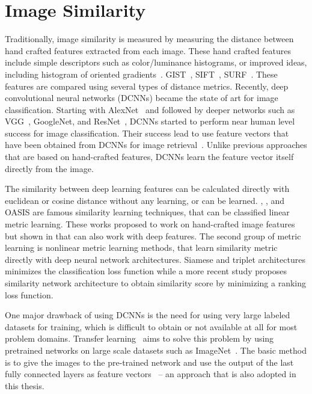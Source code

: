 \section{Image Similarity}

Traditionally, image similarity is measured by measuring the distance between hand crafted features extracted from each image. These hand crafted features include simple descriptors such as color/luminance histograms, or improved ideas, including histogram of oriented gradients~\cite{dalal2005histograms}. GIST~\cite{oliva2001modeling}, SIFT~\cite{lowe2004distinctive}, SURF~\cite{bay2006surf}. These features are compared using several types of distance metrics. Recently, deep convolutional neural networks (DCNNs) became the state of art for image classification. Starting with AlexNet~\cite{krizhevsky2012imagenet} and followed by deeper networks such as VGG~\cite{simonyan2014very}, GoogleNet\cite{szegedy2015going}, and ResNet~\cite{he2016deep}, DCNNs started to perform near human level success for image classification. Their success lead to use feature vectors that have been obtained from DCNNs for image retrieval~\cite{wan2014deep,gordo2016deep,noh2017large,radenovic2018fine}. Unlike previous approaches that are based on hand-crafted features, DCNNs learn the feature vector itself directly from the image. 

The similarity between deep learning features can be calculated directly with euclidean or cosine distance without any learning, or can be learned. \cite{frome2007image}, \cite{mcfee2010metric}, \cite{liang2016optimizing} and  OASIS\cite{chechik2010large} are famous similarity learning techniques, that can be classified linear metric learning. These works proposed to work on hand-crafted image features but shown in \cite{wan2014deep} that can also work with deep features. The second group of metric learning is nonlinear metric learning methods, that learn similarity metric directly with deep neural network architectures\cite{pinheiro2018unsupervised}. Siamese\cite{chopra2005learning}\cite{bell2015learning} and triplet\cite{wang2014learning} \cite{arandjelovic2016netvlad} architectures minimizes the classification loss function while a more recent study \cite{garcia2019learning} proposes similarity network architecture to obtain similarity score by minimizing a ranking loss function.

One major drawback of using DCNNs is the need for using very large labeled datasets for training, which is difficult to obtain or not available at all for most problem domains. Transfer learning~\cite{yosinski2014transferable} aims to solve this problem by using pretrained networks on large scale datasets such as ImageNet~\cite{russakovsky2015imagenet}. The basic method is to give the images to the pre-trained network and use the output of the last fully connected layers as feature vectors~\cite{donahue2014decaf,wan2014deep} -- an approach that is also adopted in this thesis.

